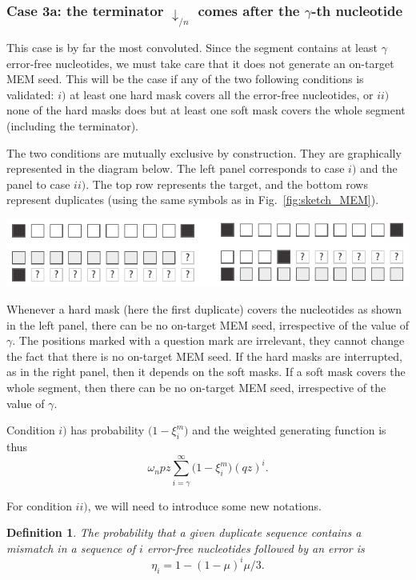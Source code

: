 \documentclass{article}
\newtheorem{definition}{Definition}
\newenvironment{inset}
{\vspace{0.5\baselineskip}\begin{center}}
{\end{center}\vspace{0.5\baselineskip}}
\begin{document}
\subsubsection*{Case 3a: the terminator $\downarrow_{/n}$ comes after the
$\gamma$-th nucleotide}

This case is by far the most convoluted. Since the segment contains at
least $\gamma$ error-free nucleotides, we must take care that it does not
generate an on-target MEM seed. This will be the case if any of the two
following conditions is validated: $i)$ at least one hard mask covers all
the error-free nucleotides, or $ii)$ none of the hard masks does but at
least one soft mask covers the whole segment (including the terminator).

The two conditions are mutually exclusive by construction. They are
graphically represented in the diagram below. The left panel corresponds
to case $i)$ and the panel to case $ii)$. The top row represents the
target, and the bottom rows represent duplicates (using the same
symbols as in Fig.~\ref{fig:sketch_MEM}).
\begin{inset}
\includegraphics{masks.pdf}
\end{inset}

Whenever a hard mask (here the first duplicate) covers the nucleotides
as shown in the left panel, there can be no on-target MEM seed,
irrespective of the value of $\gamma$. The positions marked with a
question mark are irrelevant, they cannot change the fact that there is no
on-target MEM seed. If the hard masks are interrupted, as in the right
panel, then it depends on the soft masks. If a soft mask covers the whole
segment, then there can be no on-target MEM seed, irrespective of the
value of $\gamma$.

Condition $i)$ has probability $\big(1 - \xi_i^m \big)$ and the
weighted generating function is thus
\begin{equation*}
\omega_n pz \sum_{i=\gamma}^\infty \Big(1 - \xi_i^m \Big) (qz)^i.
\end{equation*}

For condition $ii)$, we will need to introduce some new notations.
\begin{definition}
The probability that a given duplicate sequence contains a mismatch in a
sequence of $i$ error-free nucleotides followed by an error is
\begin{equation}
\label{eq:eta}
\eta_i = 1-(1-\mu)^i\mu/3.
\end{equation}
\end{definition}
\end{document}
